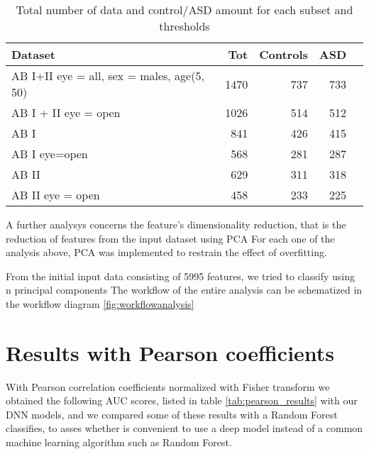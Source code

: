 \documentclass[11pt]{report}
\begin{document}
\begin{table}[!htp]\centering
\scriptsize
\begin{tabular}{lrrrr}\toprule
Dataset &Tot &Controls &ASD \\\midrule
AB I+II eye = all, sex = males, age(5, 50) &1470 &737 &733 \\
AB I + II eye = open &1026 &514 &512 \\
AB I &841 &426 &415 \\
AB I eye=open &568 &281 &287 \\
AB II &629 &311 &318 \\
AB II eye = open &458 &233 &225 \\
\bottomrule
\end{tabular}
\caption{Total number of data and control/ASD amount for each subset and thresholds}
\label{tab:controlasd_per_subset}
\end{table}


A further analysys concerns the feature's dimensionality reduction, that is the reduction of features from the input dataset using PCA
For each one of the analysis above, PCA was implemented to restrain the effect of overfitting.

From the initial input data consisting of 5995 features, we tried to classify using n principal components
The workflow of the entire analysis can be schematized in the workflow diagram \ref{fig:workflowanalysis}



\newpage
\section{Results with Pearson coefficients}

With Pearson correlation coefficients normalized with Fisher transform we obtained the following AUC scores, listed in table \ref{tab:pearson_results} with our DNN models, and we compared some of these results with a Random Forest classifies, to asses whether is convenient to use a deep model instead of a common machine learning algorithm such as Random Forest.
\end{document}
